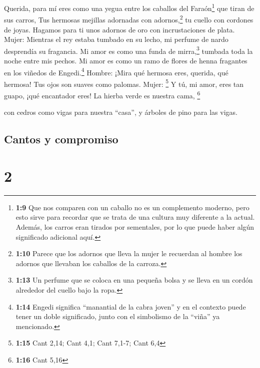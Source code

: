  Querida, para mí eres como una yegua entre los caballos
del Faraón\footnote{\textbf{1:9} Que nos comparen con un caballo no es
  un complemento moderno, pero esto sirve para recordar que se trata de
  una cultura muy diferente a la actual. Además, los carros eran tirados
  por sementales, por lo que puede haber algún significado adicional
  aquí.} que tiran de sus carros,  Tus hermosas mejillas
adornadas con adornos,\footnote{\textbf{1:10} Parece que los adornos que
  lleva la mujer le recuerdan al hombre los adornos que llevaban los
  caballos de la carroza.} tu cuello con cordones de joyas.
 Hagamos para ti unos adornos de oro con incrustaciones
de plata. Mujer:  Mientras el rey estaba tumbado en su
lecho, mi perfume de nardo desprendía su fragancia.  Mi
amor es como una funda de mirra,\footnote{\textbf{1:13} Un perfume que
  se coloca en una pequeña bolsa y se lleva en un cordón alrededor del
  cuello bajo la ropa.} tumbada toda la noche entre mis pechos.
 Mi amor es como un ramo de flores de henna fragantes en
los viñedos de Engedi.\footnote{\textbf{1:14} Engedi significa
  ``manantial de la cabra joven'' y en el contexto puede tener un doble
  significado, junto con el simbolismo de la ``viña'' ya mencionado.}
Hombre:  ¡Mira qué hermosa eres, querida, qué hermosa!
Tus ojos son suaves como palomas. Mujer: \footnote{\textbf{1:15} Cant
  2,14; Cant 4,1; Cant 7,1-7; Cant 6,4}  Y tú, mi amor,
eres tan guapo, ¡qué encantador eres! La hierba verde es nuestra cama,
\footnote{\textbf{1:16} Cant 5,16}

 con cedros como vigas para nuestra ``casa'', y árboles
de pino para las vigas.

\hypertarget{cantos-y-compromiso}{%
\subsection{Cantos y compromiso}\label{cantos-y-compromiso}}

\hypertarget{section-1}{%
\section{2}\label{section-1}}

